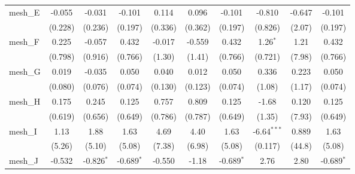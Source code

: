 \begin{tabular}{lccccccccc}
   mesh\_E                                                     & -0.055         & -0.031         & -0.101        & 0.114         & 0.096         & -0.101        & -0.810        & -0.647  & -0.101\\   
                                                               & (0.228)        & (0.236)        & (0.197)       & (0.336)       & (0.362)       & (0.197)       & (0.826)       & (2.07)  & (0.197)\\   
   mesh\_F                                                     & 0.225          & -0.057         & 0.432         & -0.017        & -0.559        & 0.432         & 1.26$^{*}$    & 1.21    & 0.432\\   
                                                               & (0.798)        & (0.916)        & (0.766)       & (1.30)        & (1.41)        & (0.766)       & (0.721)       & (7.98)  & (0.766)\\   
   mesh\_G                                                     & 0.019          & -0.035         & 0.050         & 0.040         & 0.012         & 0.050         & 0.336         & 0.223   & 0.050\\   
                                                               & (0.080)        & (0.076)        & (0.074)       & (0.130)       & (0.123)       & (0.074)       & (1.08)        & (1.17)  & (0.074)\\   
   mesh\_H                                                     & 0.175          & 0.245          & 0.125         & 0.757         & 0.809         & 0.125         & -1.68         & 0.120   & 0.125\\   
                                                               & (0.619)        & (0.656)        & (0.649)       & (0.786)       & (0.787)       & (0.649)       & (1.35)        & (7.93)  & (0.649)\\   
   mesh\_I                                                     & 1.13           & 1.88           & 1.63          & 4.69          & 4.40          & 1.63          & -6.64$^{***}$ & 0.889   & 1.63\\   
                                                               & (5.26)         & (5.10)         & (5.08)        & (7.38)        & (6.98)        & (5.08)        & (0.117)       & (44.8)  & (5.08)\\   
   mesh\_J                                                     & -0.532         & -0.826$^{*}$   & -0.689$^{*}$  & -0.550        & -1.18         & -0.689$^{*}$  & 2.76          & 2.80    & -0.689$^{*}$\\   

\end{tabular}
